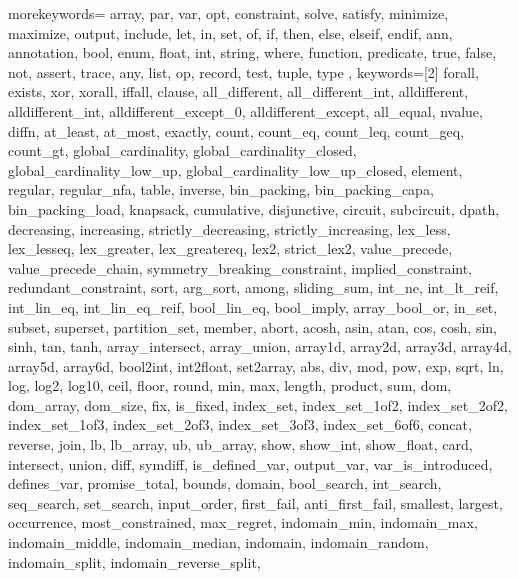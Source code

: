 \usepackage{listings}
\usepackage{courier} %

\newcommand\mznfont{\fontfamily{pcr}\selectfont}

{
  morekeywords={
  array, par, var, opt, constraint, solve, satisfy, minimize,
  maximize, output, include, let, in, set, of, if, then, else, elseif, endif,
  ann, annotation, bool, enum, float, int, string, where, function,
  predicate, true, false, not, assert, trace,
  any, list, op, record, test, tuple, type
  },
  keywords=[2]{
  forall, exists, xor, xorall, iffall, clause,
  all_different, all_different_int, alldifferent, alldifferent_int,
  alldifferent_except_0, alldifferent_except, all_equal,
  nvalue, diffn,
  at_least, at_most, exactly, %
  count, count_eq, count_leq, count_geq, count_gt,
  global_cardinality, global_cardinality_closed,
  global_cardinality_low_up, global_cardinality_low_up_closed,
  element, regular, regular_nfa, table, inverse,
  bin_packing, bin_packing_capa, bin_packing_load, knapsack,
  cumulative, disjunctive, circuit, subcircuit, dpath,
  decreasing, increasing,
  strictly_decreasing, strictly_increasing, %
  lex_less, lex_lesseq, lex_greater, lex_greatereq, lex2, strict_lex2,
  value_precede, value_precede_chain,
  symmetry_breaking_constraint, implied_constraint, redundant_constraint,
  sort, arg_sort, among, sliding_sum,
  int_ne, int_lt_reif, int_lin_eq, int_lin_eq_reif, bool_lin_eq,
  bool_imply, array_bool_or,
  in_set, subset, superset, partition_set, member,
  abort,
  acosh, asin, atan, cos, cosh, sin, sinh, tan, tanh,
  array_intersect, array_union,
  array1d, array2d, array3d, array4d, array5d, array6d,
  bool2int, int2float, set2array,
  abs, div, mod, pow, exp, sqrt, ln, log, log2, log10,
  ceil, floor, round,
  min, max, length, product, sum,
  dom, dom_array, dom_size, fix, is_fixed,
  index_set, index_set_1of2, index_set_2of2,
  index_set_1of3, index_set_2of3, index_set_3of3, index_set_6of6,
  concat, reverse, join,
  lb, lb_array, ub, ub_array,
  show, show_int, show_float,
  card, intersect, union, diff, symdiff,
  is_defined_var, output_var, var_is_introduced, defines_var,
  promise_total, bounds, domain, bool_search, int_search, seq_search,
  set_search, input_order, first_fail, anti_first_fail, smallest,
  largest, occurrence, most_constrained, max_regret, indomain_min,
  indomain_max, indomain_middle, indomain_median, indomain,
  indomain_random, indomain_split, indomain_reverse_split,
}}
